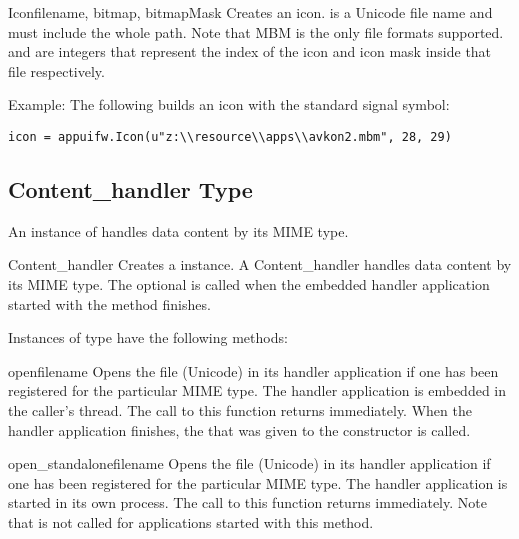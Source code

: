 \begin{classdesc}{Icon}{filename, bitmap, bitmapMask}
Creates an icon.  is a Unicode file name and must 
include the whole path. Note that MBM is the only file formats supported.
 and  are integers that represent the index of 
the icon and icon mask inside that file respectively.
\end{classdesc}

Example: The following builds an icon with the standard signal symbol:
\begin{verbatim}
icon = appuifw.Icon(u"z:\\resource\\apps\\avkon2.mbm", 28, 29)
\end{verbatim}

\subsection{Content_handler Type}
\label{subsec:content}

An instance of  handles data content by its MIME 
type.

\begin{classdesc}{Content_handler}{}
Creates a  instance. A Content_handler handles
data content by its MIME type. The optional
 is called when the embedded handler application 
started with the  method finishes. 
\end{classdesc}

Instances of  type have the following methods:

\begin{methoddesc}{open}{filename}
Opens the file  (Unicode) in its handler 
application if one has been registered for the particular MIME type. The 
handler application is embedded in the caller's thread. The call to this 
function returns immediately. When the handler application finishes, the 
 that was given to the  
constructor is called.
\end{methoddesc}

\begin{methoddesc}{open_standalone}{filename}
Opens the file  (Unicode) in its handler 
application if one has been registered for the particular MIME type. The 
handler application is started in its own process. The call to this function 
returns immediately. Note that  is not called for 
applications started with this method.
\end{methoddesc}

